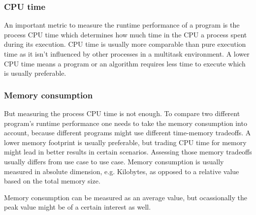 \subsubsection{CPU time}
An important metric to measure the runtime performance of a program is the process CPU time which determines how much time in the CPU a process spent during its execution. CPU time is usually more comparable than pure execution time as it isn't influenced by other processes in a multitask environment. A lower CPU time means a program or an algorithm requires less time to execute which is usually preferable.

\subsubsection{Memory consumption}
But measuring the process CPU time is not enough. To compare two different program's runtime performance one needs to take the memory consumption into account, because different programs might use different time-memory tradeoffs. A lower memory footprint is usually preferable, but trading CPU time for memory might lead in better results in certain scenarios. Assessing those memory tradeoffs usually differs from use case to use case. Memory consumption is usually measured in absolute dimension, e.g. Kilobytes, as opposed to a relative value based on the total memory size.

Memory consumption can be measured as an average value, but ocassionally the peak value might be of a certain interest as well.
